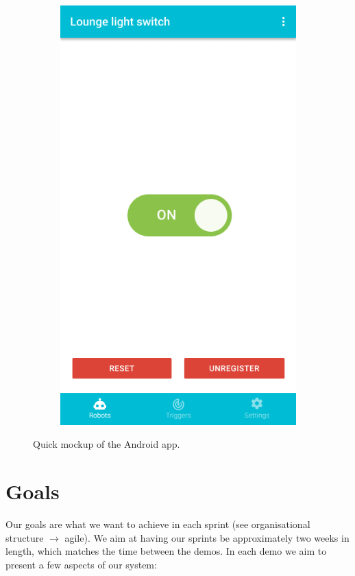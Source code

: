 \documentclass[onecolumn]{IEEEtran}
\begin{document}
\begin{figure}[H]
\begin{subfigure}{.33\textwidth}
        \includegraphics[width=.9\linewidth]{images/app-3.png}
    \end{subfigure}
    \caption{Quick mockup of the Android app.}
    \label{fig:fig}
\end{figure}

\section{Goals}

Our goals are what we want to achieve in each sprint (see organisational structure $\rightarrow$ agile). We aim at having our sprints be approximately two weeks in length, which matches the time between the demos. In each demo we aim to present a few aspects of our system:
\end{document}
